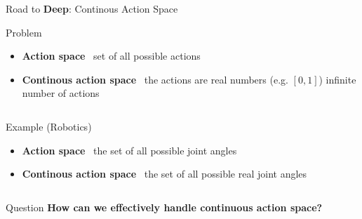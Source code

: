 \documentclass[presentation, 9pt]{beamer}\mode<presentation>{\usetheme{AMSBolognaFC}}
\begin{document}
\begin{frame}{Road to \textbf{Deep}: Continous Action Space}
	\begin{block}{Problem}
		\begin{itemize}
			\item \textbf{Action space} \faArrowRight \, set of all possible actions
			\item \textbf{Continous action space} \faArrowRight \, the actions are real numbers (e.g. $[0,1]$) \faArrowRight infinite number of actions
		\end{itemize}
	\end{block}
	\begin{columns}
		\begin{column}{0.5\textwidth}
			\begin{block}{Example (Robotics) \, \href{}{\faLink}}
				\begin{itemize}
					\item \textbf{Action space} \faArrowRight \, the set of all possible joint angles
					\item \textbf{Continous action space} \faArrowRight \, the set of all possible real joint angles
				\end{itemize}
			\end{block}
		\end{column}
		\begin{column}{0.5\textwidth}
			\centering
		\end{column}
	\end{columns}
	
	\begin{alertblock}{Question}
		\centering
		\textbf{How can we effectively handle continuous action space?}
	\end{alertblock}
\end{frame}
\end{document}
